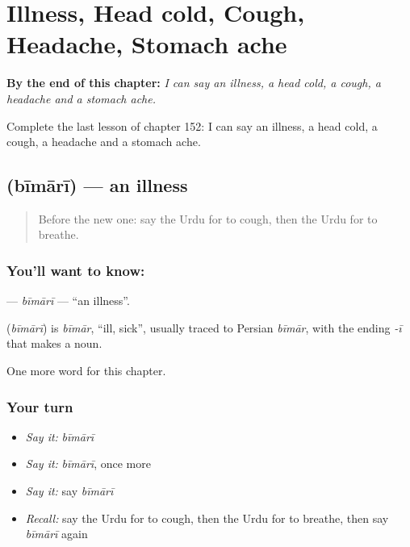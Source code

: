 
\chapter{Illness, Head cold, Cough, Headache, Stomach ache}
\label{ch:ur-illness-head-cold-cough-headache-stomach-ache}

\begin{chapteropening}
\textbf{By the end of this chapter:} \emph{I can say an illness, a head cold, a cough, a headache and a stomach ache.}

Complete the last lesson of chapter 152: I can say an illness, a head cold, a cough, a headache and a stomach ache.
\end{chapteropening}

\section[\texorpdfstring{\ur{بیماری} (bīmārī)}{بیماری (bīmārī)}]{ (bīmārī) — an illness}

\label{lesson:UR-C152-bimari}



\begin{quote}
Before the new one: say the Urdu for to cough, then the Urdu for to breathe.
\end{quote}

\subsection*{You'll want to know: }
\textbf{} — \emph{bīmārī} — \textquotedblleft{}an illness\textquotedblright{}.

\begin{cousinweb}
\textbf{} (\emph{bīmārī}) is \emph{bīmār}, \textquotedblleft{}ill, sick\textquotedblright{}, usually traced to Persian \emph{bīmār}, with the ending \emph{-ī} that makes a noun.
\end{cousinweb}

\begin{grammarlens}[title={What you've built}]
One more word for this chapter.
\end{grammarlens}

\subsection*{Your turn}
\begin{itemize}
\raggedright
  \item \emph{Say it:} \emph{bīmārī}
  \item \emph{Say it:} \emph{bīmārī}, once more
  \item \emph{Say it:} say \emph{bīmārī}
  \item \emph{Recall:} say the Urdu for to cough, then the Urdu for to breathe, then say \emph{bīmārī} again
\end{itemize}

